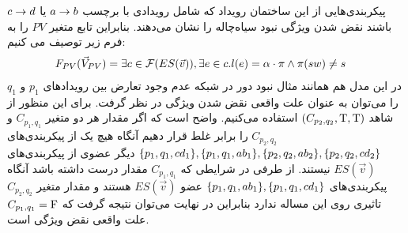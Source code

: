 \begin{figure}
    \caption{}
    \label{fig:blackhole:es}
\end{figure}
پیکربندی‌هایی از این ساختمان رویداد که شامل رویدادی با برچسب 
$a \rightarrow b$
یا 
$c \rightarrow d$
باشند نقض شدن ویژگی نبود سیاه‌چاله را نشان می‌دهند.
بنابراین تابع متغیر
$PV$
را به فرم زیر توصیف می کنیم:
\begin{align*}
    F_{PV}(\vec V_{PV}) & = \exists c \in \mathcal{F}(ES(\vec v)),
    \exists e \in c. l(e) =  \alpha\cdot\pi \wedge \pi(sw) \neq s
\end{align*}
در این مدل هم همانند مثال نبود دور در شبکه عدم وجود تعارض بین رویداد‌های 
$p_1$
و
$q_1$
را می‌توان به عنوان علت واقعی نقض شدن ویژگی در نظر گرفت.
برای این منظور از شاهد
$(C_{p_2,q_2},\mathrm{T},\mathrm{T})$
استفاده می‌کنیم.
واضح است که اگر مقدار هر دو متغیر
$C_{p_1,q_1}$
و
$C_{p_2,q_2}$
را برابر غلط قرار دهیم آنگاه هیچ یک از پیکر‌بندی‌های 
$\{p_1,q_1,cd_1\},\{p_1,q_1,ab_1\},\{p_2,q_2,ab_2\},\{p_2,q_2,cd_2\}$
دیگر عضوی از پیکربندی‌های 
$ES(\vec v)$
نیستند.
از طرفی در شرایطی که 
$C_{p_1,q_1}$
مقدار درست داشته باشد آنگاه پیکربندی‌های
$\{p_1,q_1,ab_1\},\{p_1,q_1,cd_1\}$
عضو
$ES(\vec v)$
هستند و مقدار متغیر
$C_{p_2,q_2}$
تاثیری روی این مساله ندارد بنابراین در نهایت می‌توان نتیجه گرفت که 
$C_{p_1,q_1} = \mathrm{F}$
علت واقعی نقض ویژگی است.